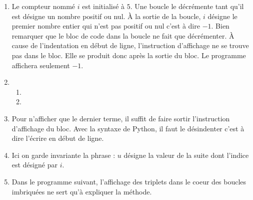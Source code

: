 \begin{enumerate}
  \item Le compteur nommé $i$ est initialisé à $5$. Une boucle le décrémente tant qu'il est désigne un nombre positif ou nul. \`A la sortie de la boucle, $i$ désigne le premier nombre entier qui n'est pas positif ou nul c'est à dire $-1$. Bien remarquer que le bloc de code dans la boucle ne fait que décrémenter. \`A cause de l'indentation en début de ligne, l'instruction d'affichage ne se trouve pas dans le bloc. Elle se produit donc après la sortie du bloc. Le programme affichera seulement $-1$.
  \item 
\begin{enumerate}
  \item 


  \item 

\end{enumerate}

  \item 


Pour n'afficher que le dernier terme, il suffit de faire sortir l'instruction d'affichage du bloc. Avec la syntaxe de Python, il faut le désindenter c'est à dire l'écrire en début de ligne.

  \item Ici on garde invariante la phrase : \og $u$ désigne la valeur de la suite dont l'indice est désigné par $i$\fg.


  \item Dans le programme suivant, l'affichage des triplets dans le coeur des boucles imbriquées ne sert qu'à expliquer la méthode.

\end{enumerate}
